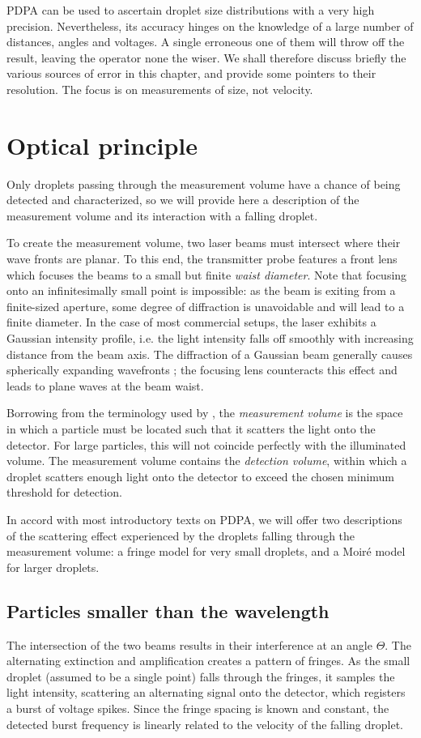 \documentclass[11.5pt]{book}
\begin{document}
PDPA can be used to ascertain droplet size distributions with a very high
precision. Nevertheless, its accuracy hinges on the knowledge of a large number
of distances, angles and voltages. A single erroneous one of them will throw
off the result, leaving the operator none the wiser. We shall therefore discuss
briefly the various sources of error in this chapter, and provide some pointers
to their resolution. The focus is on measurements of size, not velocity.

\section{Optical principle}
Only droplets passing through the measurement volume have a chance of being
detected and characterized, so we will provide here a description of the 
measurement volume and its interaction with a falling droplet.

To create the measurement volume, two laser beams must intersect where their
wave fronts are planar. To this end, the transmitter probe features a front lens
which focuses the beams to a small but finite \emph{waist diameter}. Note that
focusing onto an infinitesimally small point is impossible: as the beam is
exiting from a finite-sized aperture, some degree of diffraction is unavoidable
and will lead to a finite diameter. In the case of most commercial setups, the
laser exhibits a Gaussian intensity profile, i.e. the light intensity falls off
smoothly with increasing distance from the beam axis. The diffraction of a
Gaussian beam generally causes spherically expanding wavefronts
\cite{Thyagarajan10}; the focusing lens counteracts this effect and leads to
plane waves at the beam waist.

Borrowing from the terminology used by \citet{Albrecht03}, the \emph{measurement
volume} is the space in which a particle must be located such that it scatters
the light onto the detector. For large particles, this will not coincide
perfectly with the illuminated volume. The measurement volume contains the
\emph{detection volume}, within which a droplet scatters enough light onto the
detector to exceed the chosen minimum threshold for detection.

In accord with most introductory texts on PDPA, we will offer two descriptions
of the scattering effect experienced by the droplets falling through the
measurement volume: a fringe model for very small droplets, and a Moiré model
for larger droplets.

\subsection{Particles smaller than the wavelength}
The intersection of the two beams results in their interference at an angle
$\Theta$. The alternating extinction and amplification creates a pattern of
fringes. As the small droplet (assumed to be a single point) falls through the
fringes, it samples the light intensity, scattering an alternating signal onto
the detector, which registers a burst of voltage spikes. Since the fringe
spacing is known and constant, the detected burst frequency is linearly related
to the velocity of the falling droplet.
\end{document}
